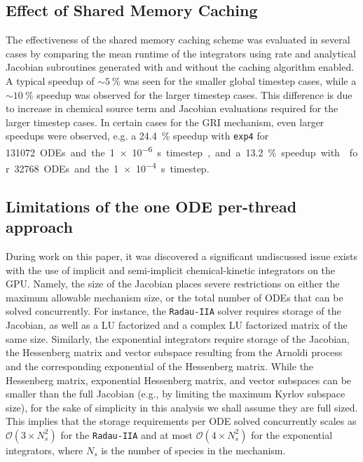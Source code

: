 \documentclass[preprint]{elsarticle}
\begin{document}
\subsection{Effect of Shared Memory Caching}
\label{S:smem}
The effectiveness of the shared memory caching scheme was evaluated in several cases by comparing the mean runtime of the integrators using rate and analytical Jacobian subroutines generated with and without the caching algorithm enabled.
A typical speedup of $\sim\SI{5}{\percent}$ was seen for the smaller global timestep cases, while a $\sim\SI{10}{\percent}$ speedup was observed for the larger timestep cases.
This difference is due to increase in chemical source term and Jacobian evaluations required for the larger timestep cases.
In certain cases for the GRI mechanism, even larger speedups were observed, e.g. a \SI{24.4}{\percent} speedup with \texttt{exp4} for \SI{131072} ODEs and the \SI{1e-6}{\s} timestep, and a \SI{13.2}{\percent} speedup with  for \SI{32768} ODEs and the \SI{1e-4}{\s} timestep.


\subsection{Limitations of the one ODE per-thread approach}
During work on this paper, it was discovered a significant undiscussed issue exists with the use of implicit and semi-implicit chemical-kinetic integrators on the GPU.
Namely, the size of the Jacobian places severe restrictions on either the maximum allowable mechanism size, or the total number of ODEs that can be solved concurrently.
For instance, the \texttt{Radau-IIA} solver requires storage of the Jacobian, as well as a LU factorized and a complex LU factorized matrix of the same size.
Similarly, the exponential integrators require storage of the Jacobian, the Hessenberg matrix and vector subspace resulting from the Arnoldi process and the corresponding exponential of the Hessenberg matrix.
While the Hessenberg matrix, exponential Hessenberg matrix, and vector subspaces can be smaller than the full Jacobian (e.g., by limiting the maximum Kyrlov subspace size), for the sake of simplicity in this analysis we shall assume they are full sized.
This implies that the storage requirements per ODE solved concurrently scales as $\mathcal{O}\left(3 \times N_s^2\right)$ for the \texttt{Radau-IIA} and at most $\mathcal{O}\left(4 \times N_s^2\right)$ for the exponential integrators, where $N_s$ is the number of species in the mechanism.
\end{document}
